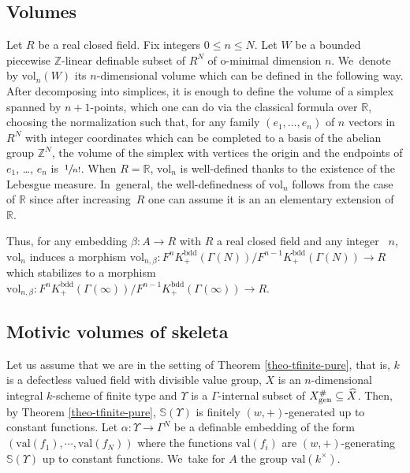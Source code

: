 \documentclass[JEP,XML,SOM,Unicode,ThmDefs,NoEqCountersInSection,published]{cedram}
\newcommand{\val}{\mathrm{val}}
\newcommand{\R}{\mathbb R}
\newcommand{\Z}{\mathbb Z}
\renewcommand{\SS}{\mathbb S}
\theoremstyle{plain}
\theoremstyle{definition}
\begin{document}
\subsection{Volumes}
Let $R$ be a real closed field. Fix integers $0 \leq n \leq N$.
Let $W$ be a bounded piecewise $\Z$-linear definable subset of $R^N$ of o-minimal dimension $n$. We~denote by
$\mathrm{vol}_{n} (W)$ its
$n$\nobreakdash-dimen\-sional volume which can be defined in the following way. After decomposing into simplices, it is enough to define the volume
of a simplex spanned by $n +1$-points, which one can do via the classical formula over $\R$, choosing
the normalization such that,
for any family $(e_1, \dots, e_n)$ of $n$ vectors in $R^N$ with integer coordinates which can be completed to
a basis of the abelian group $\Z^N$, the volume of the simplex with vertices the origin and the endpoints of $e_1$, \dots, $e_n$ is~$\sfrac{1}{n!}$.
When $R = \R$, $\mathrm{vol}_{n}$ is well-defined thanks to the existence of the Lebesgue measure. In~general,
the well-definedness of $\mathrm{vol}_{n}$
follows from the case of $\R$ since
after increasing~$R$ one can assume it
is an
an elementary extension of $\R$.

Thus, for any embedding $\beta: A \to R$ with $R$ a real closed field
and any integer~ $n$,
$\mathrm{vol}_{n}$
induces a morphism
$\mathrm{vol}_{n, \beta}: F^nK^{\mathrm{bdd}} _+ (\Gamma (N))
/F^{n-1} K^{\mathrm{bdd}} _+ (\Gamma (N))\to R$ which stabilizes to a morphism
$\mathrm{vol}_{n, \beta}: F^nK^{\mathrm{bdd}} _+ (\Gamma (\infty))/F^{n-1} K^{\mathrm{bdd}} _+
(\Gamma (\infty)) \to R$.

\subsection{Motivic volumes of skeleta}\label{mvs}
Let us assume that we are in the setting of Theorem \ref{theo-tfinite-pure},
that is, $k$ is a defectless valued field with divisible value group,
$X$ is an $n$\nobreakdash-dimen\-sional integral $k$-scheme of finite type and $\Upsilon$ is a $\Gamma$-internal subset
of $X^{\#}_{\mathrm{gen}}\subseteq\nobreak \widehat X$.
Then, by
Theorem \ref{theo-tfinite-pure},
$\SS(\Upsilon)$
is finitely $(w,+)$-generated up to constant functions.
Let $\alpha:
\Upsilon \to \Gamma^N$
be a definable embedding of the form
$(\val (f_1), \cdots, \val(f_N))$ where the functions
$\val (f_i)$ are
$(w,+)$-generating $\SS(\Upsilon)$ up to constant functions.
We~take for $A$ the group $\val (k^{\times})$.
\end{document}
